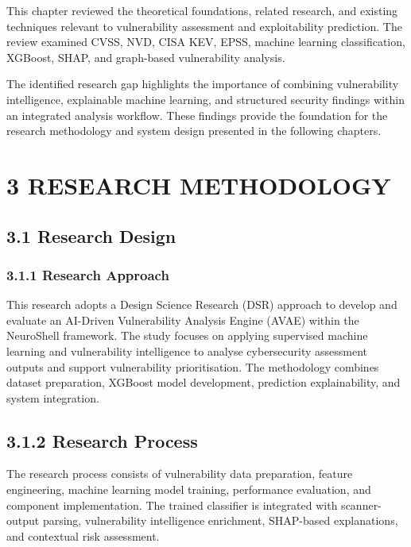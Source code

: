 \documentclass[
]{article}
\begin{document}
This chapter reviewed the theoretical foundations, related research, and
existing techniques relevant to vulnerability assessment and
exploitability prediction. The review examined CVSS, NVD, CISA KEV,
EPSS, machine learning classification, XGBoost, SHAP, and graph-based
vulnerability analysis.

The identified research gap highlights the importance of combining
vulnerability intelligence, explainable machine learning, and structured
security findings within an integrated analysis workflow. These findings
provide the foundation for the research methodology and system design
presented in the following chapters.

\hypertarget{research-methodology}{%
\section{3 RESEARCH METHODOLOGY}\label{research-methodology}}

\hypertarget{research-design}{%
\subsection{3.1 Research Design}\label{research-design}}

\hypertarget{research-approach}{%
\subsubsection{3.1.1 Research Approach}\label{research-approach}}

This research adopts a Design Science Research (DSR) approach to develop
and evaluate an AI-Driven Vulnerability Analysis Engine (AVAE) within
the NeuroShell framework. The study focuses on applying supervised
machine learning and vulnerability intelligence to analyse cybersecurity
assessment outputs and support vulnerability prioritisation. The
methodology combines dataset preparation, XGBoost model development,
prediction explainability, and system integration.

\hypertarget{research-process}{%
\subsection{3.1.2 Research Process}\label{research-process}}

The research process consists of vulnerability data preparation, feature
engineering, machine learning model training, performance evaluation,
and component implementation. The trained classifier is integrated with
scanner-output parsing, vulnerability intelligence enrichment,
SHAP-based explanations, and contextual risk assessment.
\end{document}
